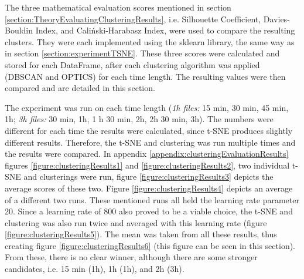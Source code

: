
The three mathematical evaluation scores mentioned in section \ref{section:TheoryEvaluatingClusteringResults}, i.e. Silhouette Coefficient, Davies-Bouldin Index, and Caliński-Harabasz Index, were used to compare the resulting clusters.  They were each implemented using the sklearn library, the same way as in section \ref{section:experimentTSNE}. These three scores were calculated and stored for each DataFrame, after each clustering algorithm was applied (DBSCAN and OPTICS) for each time length. The resulting values were then compared and are detailed in this section.

The experiment was run on each time length (\textit{1h files:} 15 min, 30 min, 45 min, 1h; \textit{3h files:} 30 min, 1h, 1 h 30 min, 2h, 2h 30 min, 3h).
The numbers were different for each time the results were calculated, since t-SNE produces slightly different results. Therefore, the t-SNE and clustering was run multiple times and the results were compared. In appendix \ref{appendix:clusteringEvaluationResults} figures \ref{figure:clusteringResults1} and \ref{figure:clusteringResults2}, two individual t-SNE and clusterings were run, figure \ref{figure:clusteringResults3} depicts the average scores of these two. Figure \ref{figure:clusteringResults4} depicts an average of a different two runs. These mentioned runs all held the learning rate parameter 20. Since a learning rate of 800 also proved to be a viable choice, the t-SNE and clustering was also run twice and averaged with this learning rate (figure \ref{figure:clusteringResults5}). The mean was taken from all these results, thus creating figure \ref{figure:clusteringResults6} (this figure can be seen in this section). From these, there is no clear winner, although there are some stronger candidates, i.e. 15 min (1h), 1h (1h), and 2h (3h). 

